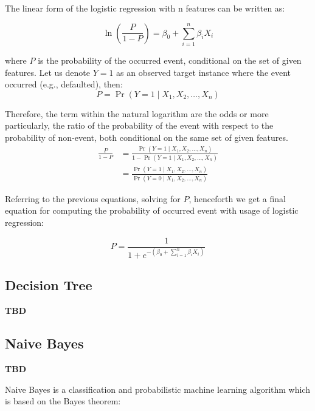 The linear form of the logistic regression with n features can be written as:

\begin{equation}\label{eq}
    \ln\left(\frac{P}{1-P}\right) = \beta_0  + \sum_{i=1}^{n} \beta_i X_i
\end{equation}

where $P$ is the probability of the occurred event, conditional on the set of given features. Let us denote $Y=1$ as an observed target instance where the event occurred (e.g., defaulted), then:
\begin{equation}\label{eq}
    P = \operatorname{Pr}(Y=1 \mid X_1,X_2,\ldots,X_n)
\end{equation}

Therefore, the term within the natural logarithm are the odds or more particularly, the ratio of the probability of the event with respect to the probability of non-event, both conditional on the same set of given features.
\begin{equation}\label{eq}
    \begin{aligned}
    \frac{P}{1-P}  {} & = \frac{\operatorname{Pr}(Y=1 \mid X_1,X_2,\ldots,X_n)}{1-\operatorname{Pr}(Y=1 \mid X_1,X_2,\ldots,X_n)} \\
    & = \frac{\operatorname{Pr}(Y=1 \mid X_1,X_2,\ldots,X_n)}{\operatorname{Pr}(Y=0 \mid X_1,X_2,\ldots,X_n)}
\end{aligned}
    \end{equation}

Referring to the previous equations, solving for $P$, henceforth we get a final equation for computing the probability of occurred event with usage of logistic regression:

\begin{equation}\label{eq}
P = \frac{1}{1+e^{-\left(\beta_0 + \displaystyle\sum_{i=1}^{n} \beta_i X_i\right)}}
\end{equation}

\subsection{Decision Tree}

\textbf{TBD}
\subsection{Naive Bayes}

\textbf{TBD}

Naive Bayes is a classification and probabilistic machine learning algorithm which is based on the Bayes theorem:

